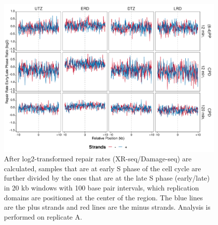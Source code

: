 \begin{figure}[H]
\begin{center}
\includegraphics[width=\textwidth]{Chapters/7_appendix/figures/supfig24}
\caption[Repair rate early/late phase ratio of replication domains in 20 kb (replicate A).]{After log2-transformed repair rates (XR-seq/Damage-seq) are calculated, samples that are at early S phase of the cell cycle are further divided by the ones that are at the late S phase (early/late) in 20 kb windows with 100 base pair intervals, which replication domains are positioned at the center of the region. The blue lines are the plus strands and red lines are the minus strands. Analysis is performed on replicate A.}
\label{supfig:rrel20repdomainA}
\end{center}
\end{figure}

